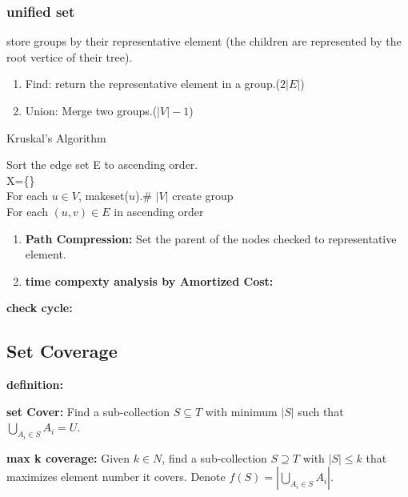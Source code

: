 \subsubsection{unified set} 
store groups by their representative element (the children are represented by the root vertice of their tree).
\begin{enumerate}[-]
    \item Find: return the representative element in a group.($2|E|$)
    \item Union: Merge two groups.($|V|-1$)
\end{enumerate}
\begin{algorithm}
    \caption{Kruskal's Algorithm}
    Sort the edge set E to ascending order.\\
    X=\{\}\\
    For each $u\in V$, makeset($u$).\# $|V|$ create group\\
    For each $(u,v) \in E$ in ascending order\\
\end{algorithm}

\begin{enumerate}
    \item \textbf{Path Compression:} Set the parent of the nodes checked to representative element.
    \item \textbf{time compexty analysis by Amortized Cost:}
\end{enumerate}


\textbf{check cycle:}

\subsection{Set Coverage}
\textbf{definition:}

\textbf{set Cover:} 
Find a sub-collection $S \subseteq T$ with minimum $|S|$ such that $\bigcup_{A_i\in S}A_i=U$.

\textbf{max k coverage:} 
Given $k \in N$, find a sub-collection $S\supseteq T$ with $|S|\leq k$ that maximizes element number it covers. Denote $f(S)=|\bigcup _{A_i\in S}A_i|$.

